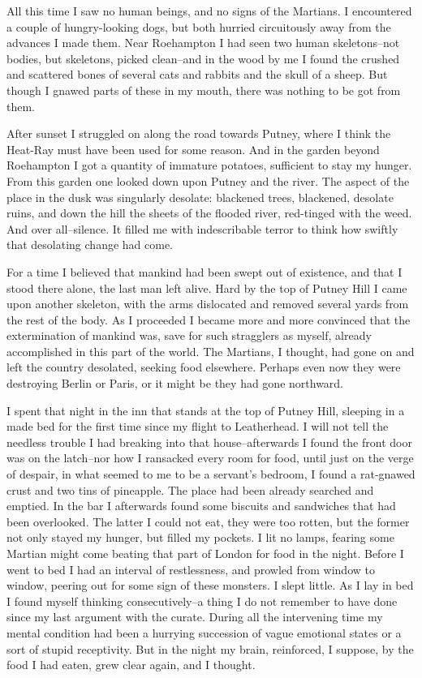 All this time I saw no human beings, and no signs of the Martians.
I encountered a couple of hungry-looking dogs, but both hurried
circuitously away from the advances I made them. Near Roehampton I
had seen two human skeletons--not bodies, but skeletons, picked
clean--and in the wood by me I found the crushed and scattered
bones of several cats and rabbits and the skull of a sheep. But
though I gnawed parts of these in my mouth, there was nothing to be
got from them.

After sunset I struggled on along the road towards Putney, where I
think the Heat-Ray must have been used for some reason. And in the
garden beyond Roehampton I got a quantity of immature potatoes,
sufficient to stay my hunger. From this garden one looked down upon
Putney and the river. The aspect of the place in the dusk was
singularly desolate: blackened trees, blackened, desolate ruins,
and down the hill the sheets of the flooded river, red-tinged with
the weed. And over all--silence. It filled me with indescribable
terror to think how swiftly that desolating change had come.

For a time I believed that mankind had been swept out of existence,
and that I stood there alone, the last man left alive. Hard by the
top of Putney Hill I came upon another skeleton, with the arms
dislocated and removed several yards from the rest of the body. As
I proceeded I became more and more convinced that the extermination
of mankind was, save for such stragglers as myself, already
accomplished in this part of the world. The Martians, I thought,
had gone on and left the country desolated, seeking food elsewhere.
Perhaps even now they were destroying Berlin or Paris, or it might
be they had gone northward.

I spent that night in the inn that stands at the top of Putney
Hill, sleeping in a made bed for the first time since my flight to
Leatherhead. I will not tell the needless trouble I had breaking
into that house--afterwards I found the front door was on the
latch--nor how I ransacked every room for food, until just on the
verge of despair, in what seemed to me to be a servant's bedroom, I
found a rat-gnawed crust and two tins of pineapple. The place had
been already searched and emptied. In the bar I afterwards found
some biscuits and sandwiches that had been overlooked. The latter I
could not eat, they were too rotten, but the former not only stayed
my hunger, but filled my pockets. I lit no lamps, fearing some
Martian might come beating that part of London for food in the
night. Before I went to bed I had an interval of restlessness, and
prowled from window to window, peering out for some sign of these
monsters. I slept little. As I lay in bed I found myself thinking
consecutively--a thing I do not remember to have done since my last
argument with the curate. During all the intervening time my mental
condition had been a hurrying succession of vague emotional states
or a sort of stupid receptivity. But in the night my brain,
reinforced, I suppose, by the food I had eaten, grew clear again,
and I thought.


